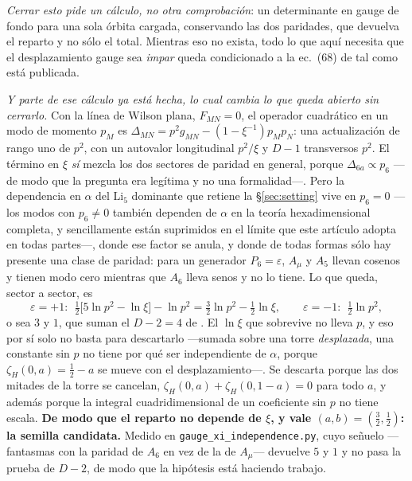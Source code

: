 \documentclass[11pt,a4paper]{article}
\begin{document}
\begin{itemize}
\emph{Cerrar esto pide un cálculo, no otra comprobación}: un determinante en gauge de fondo para
una sola órbita cargada, conservando las dos paridades, que devuelva el reparto y no sólo el total.
Mientras eso no exista, todo lo que aquí necesita que el desplazamiento gauge sea \emph{impar}
queda condicionado a la ec.~(68) de \cite{KM25} tal como está publicada.

\emph{Y parte de ese cálculo ya está hecha, lo cual cambia lo que queda abierto sin cerrarlo.} Con
la línea de Wilson plana, $F_{MN}=0$, el operador cuadrático en un modo de momento $p_M$ es
$\Delta_{MN}=p^2g_{MN}-(1-\xi^{-1})p_Mp_N$: una actualización de rango uno de $p^2$, con un
autovalor longitudinal $p^2/\xi$ y $D-1$ transversos $p^2$. El término en $\xi$ \emph{sí} mezcla
los dos sectores de paridad en general, porque $\Delta_{6a}\propto p_6$ ---de modo que la pregunta
era legítima y no una formalidad---. Pero la dependencia en $\alpha$ del $\mathrm{Li}_5$ dominante
que retiene la \S\ref{sec:setting} vive en $p_6=0$ ---los modos con $p_6\neq0$ también dependen de
$\alpha$ en la teoría hexadimensional completa, y sencillamente están suprimidos en el límite que
este artículo adopta en todas partes---, donde ese
factor se anula, y donde de todas formas sólo hay presente una clase de paridad: para un generador
$P_6=\varepsilon$, $A_\mu$ y $A_5$ llevan cosenos y tienen modo cero mientras que $A_6$ lleva senos
y no lo tiene. Lo que queda, sector a sector, es
\begin{equation}\label{eq:xisplit}
  \varepsilon=+1:\ \ \tfrac12\bigl[5\ln p^2-\ln\xi\bigr]-\ln p^2=\tfrac32\ln p^2-\tfrac12\ln\xi,
  \qquad
  \varepsilon=-1:\ \ \tfrac12\ln p^2,
\end{equation}
o sea $3$ y $1$, que suman el $D-2=4$ de \cite{HY04}. El $\ln\xi$ que sobrevive no lleva $p$, y eso
por sí solo no basta para descartarlo ---sumada sobre una torre \emph{desplazada}, una constante
sin $p$ no tiene por qué ser independiente de $\alpha$, porque $\zeta_H(0,a)=\tfrac12-a$ se mueve
con el desplazamiento---. Se descarta porque las dos mitades de la torre se cancelan,
$\zeta_H(0,a)+\zeta_H(0,1-a)=0$ para todo $a$, y además porque la integral cuadridimensional de un
coeficiente sin $p$ no tiene escala. \textbf{De modo que el reparto no depende de $\xi$, y vale
$(a,b)=(\tfrac32,\tfrac12)$: la semilla candidata.} Medido en
\texttt{gauge\_\allowbreak xi\_\allowbreak independence.py}, cuyo señuelo ---fantasmas con la
paridad de $A_6$ en vez de la de $A_\mu$--- devuelve $5$ y $1$ y no pasa la prueba de $D-2$, de
modo que la hipótesis está haciendo trabajo.


\end{itemize}
\end{document}
